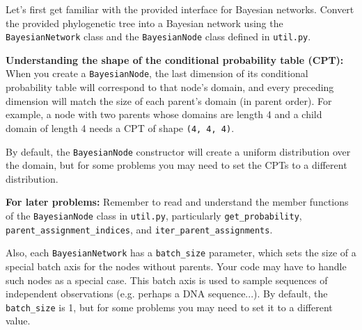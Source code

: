 \item {}
Let's first get familiar with the provided interface for Bayesian networks. Convert the provided phylogenetic tree into a Bayesian network using the \texttt{BayesianNetwork} class and the \texttt{BayesianNode} class defined in \texttt{util.py}.

\begin{redbox}

  \textbf{Understanding the shape of the conditional probability table (CPT):} When you create a \texttt{BayesianNode}, the last dimension of its conditional probability table will correspond to that node's domain, and every preceding dimension will match the size of each parent's domain (in parent order). For example, a node with two parents whose domains are length 4 and a child domain of length 4 needs a CPT of shape \texttt{(4, 4, 4)}.

  By default, the \texttt{BayesianNode} constructor will create a uniform distribution over the domain, but for some problems you may need to set the CPTs to a different distribution.

  \textbf{For later problems:} Remember to read and understand the member functions of the \texttt{BayesianNode} class in \texttt{util.py}, particularly \texttt{get\_probability}, \texttt{parent\_assignment\_indices}, and \texttt{iter\_parent\_assignments}.

  Also, each \texttt{BayesianNetwork} has a \texttt{batch\_size} parameter, which sets the size of a special batch axis for the nodes without parents. Your code may have to handle such nodes as a special case. This batch axis is used to sample sequences of independent observations (e.g. perhaps a DNA sequence...). By default, the \texttt{batch\_size} is 1, but for some problems you may need to set it to a different value.

\end{redbox}


